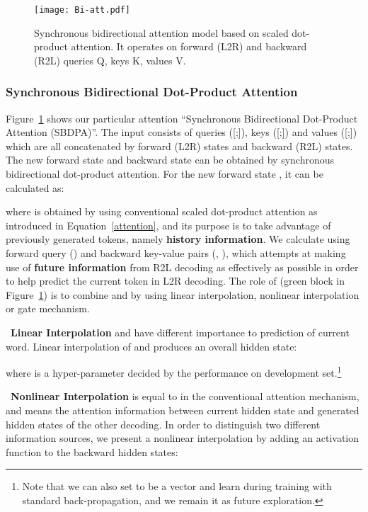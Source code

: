 \documentclass[11pt,a4paper]{article}
\begin{document}
\begin{CJK*}{UTF8}{gbsn}
\begin{figure}
    \centering
    \texttt{[image: Bi-att.pdf]}
    \caption{Synchronous bidirectional attention model based on scaled dot-product attention.
    It operates on forward (L2R) and backward (R2L) queries Q, keys K, values V.
    }\label{Bi-att}
\end{figure}

\subsubsection{Synchronous Bidirectional Dot-Product Attention} \label{SBDPA-sec}

Figure~\ref{Bi-att} shows our particular attention ``Synchronous Bidirectional Dot-Product Attention (SBDPA)''.
The input consists of queries ([;]), keys ([;]) and values ([;])
which are all concatenated by forward (L2R) states and backward (R2L) states.
The new forward state  and backward state  can be obtained by synchronous bidirectional dot-product attention. For the new forward state , it can be calculated as:

where  is obtained by using conventional scaled dot-product attention as introduced in Equation~\ref{attention}, and its purpose is to take advantage of previously generated tokens, namely {\bf history information}.
We calculate  using forward query () and backward key-value pairs (, ), which attempts at making use of {\bf future information} from R2L decoding as effectively as possible in order to help predict the current token in L2R decoding.
The role of  (green block in Figure~\ref{Bi-att}) is to combine  and  by using linear interpolation, nonlinear interpolation or gate mechanism.

~\textbf{Linear Interpolation}  and  have different importance to prediction of current word. Linear interpolation of  and  produces an overall hidden state:

where  is a hyper-parameter decided by the performance on development set.{\footnote[3]{Note that we can also set  to be a vector and learn  during training with standard back-propagation, and we remain it as future exploration.}}

~\textbf{Nonlinear Interpolation}  is equal to  in the conventional attention mechanism, and  means the attention information between current hidden state and generated hidden states of the other decoding. In order to distinguish two different information sources, we present a nonlinear interpolation by adding an activation function to the backward hidden states:


\end{CJK*}
\end{document}
